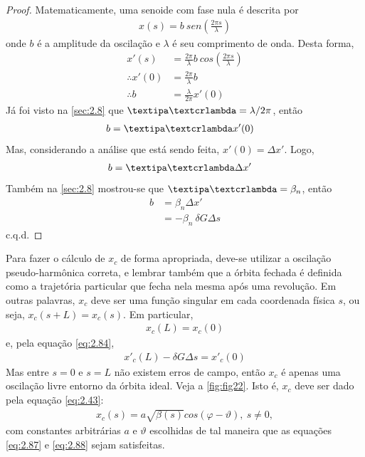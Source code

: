 \begin{proof}
	Matematicamente, uma senoide com fase nula é descrita por
	\begin{align*}
		x(s) = b\ sen\left(\frac{2\pi s}{\lambda}\right)
	\end{align*}
	onde $b$ é a amplitude da oscilação e $\lambda$ é seu comprimento de onda. Desta forma,
	\begin{align*}
		x'(s) &= \frac{2\pi}{\lambda}b\ cos\left(\frac{2\pi s}{\lambda}\right)\\
		\therefore x'(0) & = \frac{2\pi}{\lambda}b\\
		\therefore b &= \frac{\lambda}{2\pi}x'(0)
	\end{align*}
	Já foi visto na \autoref{sec:2.8} que $\lambdabar = \lambda/2\pi$, então
	\begin{align*}
		b &= \lambdabar x'(0)
	\end{align*}
	Mas, considerando a análise que está sendo feita, $x'(0) = \Delta x'$. Logo,
	\begin{align*}
		b &= \lambdabar \Delta x'
	\end{align*}
	Também na \autoref{sec:2.8} mostrou-se que $\lambdabar = \beta_n$, então
	\begin{align*}
		b &= \beta_n \Delta x'\\
		  &= -\beta_n\ \delta G \Delta s
	\end{align*}
	c.q.d.
\end{proof}

Para fazer o cálculo de $x_c$ de forma apropriada, deve-se utilizar a oscilação pseudo-harmônica correta, e lembrar também que a órbita fechada é definida como a trajetória particular que fecha nela mesma após uma revolução. Em outras palavras, $x_c$ deve ser uma função singular em cada coordenada física $s$, ou seja, $x_c(s+L) = x_c(s)$. Em particular,
\begin{align}
	x_c(L) = x_c(0)\label{eq:2.87}
\end{align}
e, pela equação \eqref{eq:2.84},
\begin{align}
	x'_c(L) - \delta G \Delta s = x'_c(0)\label{eq:2.88}
\end{align}
Mas entre $s=0$ e $s=L$ não existem erros de campo, então $x_c$ é apenas uma oscilação livre entorno da órbita ideal. Veja a \autoref{fig:fig22}. Isto é, $x_c$ deve ser dado pela equação \eqref{eq:2.43}:
\begin{align}
	x_c(s) = a\sqrt{\beta(s)}cos(\varphi - \vartheta),\ s \neq 0,
\end{align}
com constantes arbitrárias $a$ e $\vartheta$ escolhidas de tal maneira que as equações \eqref{eq:2.87} e \eqref{eq:2.88} sejam satisfeitas.

